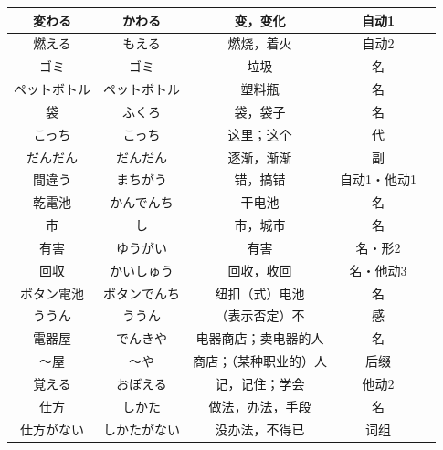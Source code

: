 \begin{longtable}{|c|c|c|c|c|}
    変わる & かわる & 变，变化 & 自动1 & \\ \hline
    燃える & もえる & 燃烧，着火 & 自动2 & \\ \hline
    ゴミ & ゴミ & 垃圾 & 名 & \\ \hline
    ペットボトル & ペットボトル & 塑料瓶 & 名 & \\ \hline
    袋 & ふくろ & 袋，袋子 & 名 & \\ \hline
    こっち & こっち & 这里；这个 & 代 & \\ \hline
    だんだん & だんだん & 逐渐，渐渐 & 副 & \\ \hline
    間違う & まちがう & 错，搞错 & 自动1・他动1 & \\ \hline
    乾電池 & かんでんち & 干电池 & 名 & \\ \hline
    市 & し & 市，城市 & 名 & \\ \hline
    有害 & ゆうがい & 有害 & 名・形2 & \\ \hline
    回収 & かいしゅう & 回收，收回 & 名・他动3 & \\ \hline
    ボタン電池 & ボタンでんち & 纽扣（式）电池 & 名 & \\ \hline
    ううん & ううん & （表示否定）不 & 感 & \\ \hline
    電器屋 & でんきや & 电器商店；卖电器的人 & 名 & \\ \hline
    〜屋 & 〜や & 商店；（某种职业的）人 & 后缀 & \\ \hline
    覚える & おぼえる & 记，记住；学会 & 他动2 & \\ \hline
    仕方 & しかた & 做法，办法，手段 & 名 & \\ \hline
    仕方がない & しかたがない & 没办法，不得已 & 词组 & \\ \hline
\end{longtable}


